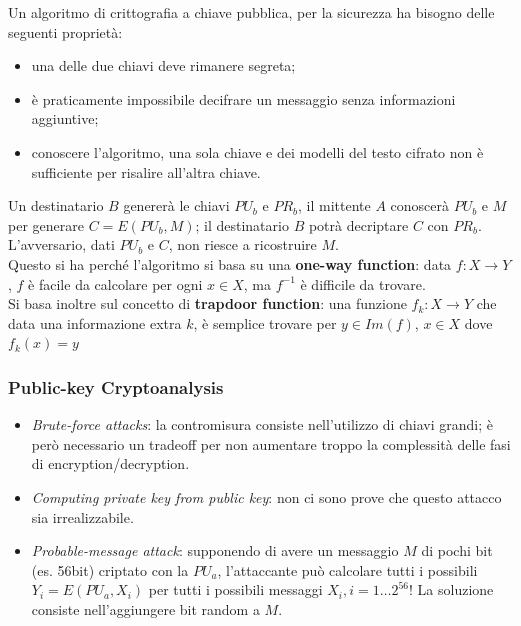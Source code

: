\documentclass[11pt, a4paper, twoside, italian]{report}
\theoremstyle{plain}
\begin{document}
\noindent
Un algoritmo di crittografia a chiave pubblica, per la sicurezza ha bisogno delle seguenti proprietà:
\begin{itemize}
	\item una delle due chiavi deve rimanere segreta;
	\item è praticamente impossibile decifrare un messaggio senza informazioni aggiuntive;
	\item conoscere l'algoritmo, una sola chiave e dei modelli del testo cifrato non è sufficiente per risalire all'altra chiave.
\end{itemize}

\noindent
Un destinatario $B$ genererà le chiavi $PU_b$ e $PR_b$, il mittente $A$ conoscerà $PU_b$ e $M$ per generare $C = E (PU_b, M)$; il destinatario $B$ potrà decriptare $C$ con $PR_b$. L'avversario, dati $PU_b$ e $C$, non riesce a ricostruire $M$.\\
Questo si ha perché l'algoritmo si basa su una \textbf{one-way function}: data $f: X \rightarrow Y$, $f$ è facile da calcolare per ogni $x\in X$, ma $f^{-1}$ è difficile da trovare.\\
Si basa inoltre sul concetto di \textbf{trapdoor function}: una funzione $f_{k}: X \longrightarrow Y$ che data una informazione extra $k$, è semplice trovare per $y \in Im(f)$, $x \in X$ dove $f_{k}(x) = y$

\subsubsection*{Public-key Cryptoanalysis}
\begin{itemize}
	\item \textit{Brute-force attacks}: la contromisura consiste nell'utilizzo di chiavi grandi; è però necessario un tradeoff per non aumentare troppo la complessità delle fasi di encryption/decryption.
	\item \textit{Computing private key from public key}: non ci sono prove che questo attacco sia irrealizzabile.
	\item \textit{Probable-message attack}: supponendo di avere un messaggio $M$ di pochi bit (es. 56bit) criptato con la $PU_a$, l'attaccante può calcolare tutti i possibili $Y_i = E(PU_a, X_i)$ per tutti i possibili messaggi $X_i, i = 1 \dots 2^{56}$! La soluzione consiste nell'aggiungere bit random a $M$.
\end{itemize}
\end{document}
